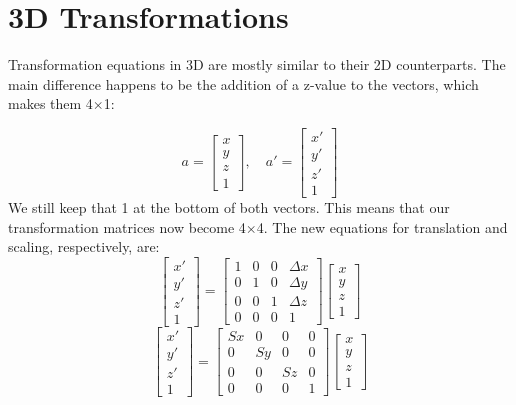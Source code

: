 \documentclass{article}
\begin{document}
\section{3D Transformations}
Transformation equations in 3D are mostly similar to their 2D counterparts. The main difference happens to be the addition of a z-value to the vectors, which makes them 4$\times$1:

\[
a = 
\begin{bmatrix}
x \\
y \\
z \\
1
\end{bmatrix}
,\quad
a' = 
\begin{bmatrix}
x' \\
y' \\
z' \\
1
\end{bmatrix}
\]
\noindent
We still keep that 1 at the bottom of both vectors. This means that our transformation matrices now become 4$\times$4. The new equations for translation and scaling, respectively, are:
\[
\begin{bmatrix}
x' \\
y' \\
z' \\
1
\end{bmatrix}
=
\begin{bmatrix}
1 & 0 & 0 & \Delta x \\
0 & 1 & 0 & \Delta y \\
0 & 0 & 1 & \Delta z \\
0 & 0 & 0 & 1
\end{bmatrix}
\begin{bmatrix}
x \\
y \\
z \\
1
\end{bmatrix}
\]
\[
\begin{bmatrix}
x' \\
y' \\
z' \\
1
\end{bmatrix}
=
\begin{bmatrix}
Sx & 0 & 0 & 0 \\
0 & Sy & 0 & 0 \\
0 & 0 & Sz & 0 \\
0 & 0 & 0 & 1
\end{bmatrix}
\begin{bmatrix}
x \\
y \\
z \\
1
\end{bmatrix}
\]
\end{document}
